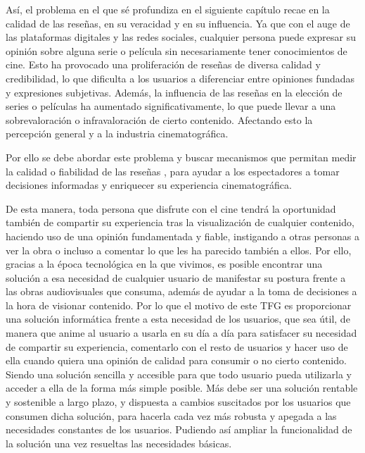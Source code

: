 Así, el problema en el que sé profundiza en el siguiente capítulo recae en la calidad de las reseñas, 
en su veracidad y en su influencia. Ya que con el auge de las plataformas digitales y las redes 
sociales, cualquier persona puede expresar su opinión sobre alguna serie o película sin necesariamente 
tener conocimientos de cine. Esto ha provocado una proliferación de reseñas de diversa calidad y 
credibilidad, lo que dificulta a los usuarios a diferenciar entre opiniones fundadas y expresiones 
subjetivas. Además, la influencia de las reseñas en la elección de series o películas ha aumentado 
significativamente, lo que puede llevar a una sobrevaloración o infravaloración de cierto contenido. 
Afectando esto la percepción general y a la industria cinematográfica.

Por ello se debe abordar este problema y buscar mecanismos que permitan medir la calidad o fiabilidad 
de las reseñas \cite{RRbyProfeMC}, para ayudar a los espectadores a tomar decisiones informadas \cite{RSforMovieRRating} y enriquecer su 
experiencia cinematográfica.

De esta manera, toda persona que disfrute con el cine tendrá la oportunidad también de compartir su 
experiencia tras la visualización de cualquier contenido, haciendo uso de una opinión fundamentada y 
fiable, instigando a otras personas a ver la obra o incluso a comentar lo que les ha parecido también a 
ellos. Por ello, gracias a la época tecnológica en la que vivimos, es posible encontrar una solución a 
esa necesidad de cualquier usuario de manifestar su postura frente a las obras audiovisuales que 
consuma, además de ayudar a la toma de decisiones a la hora de visionar contenido. Por lo que el motivo 
de este TFG es proporcionar una solución informática frente a esta necesidad de los usuarios, que sea 
útil, de manera que anime al usuario a usarla en su día a día para satisfacer su necesidad de compartir 
su experiencia, comentarlo con el resto de usuarios y hacer uso de ella cuando quiera una opinión de 
calidad para consumir o no cierto contenido. Siendo una solución sencilla y accesible para que todo 
usuario pueda utilizarla y acceder a ella de la forma más simple posible. Más debe ser una solución 
rentable y sostenible a largo plazo, y dispuesta a cambios suscitados por los usuarios que consumen 
dicha solución, para hacerla cada vez más robusta y apegada a las necesidades constantes de los 
usuarios. Pudiendo así ampliar la funcionalidad de la solución una vez resueltas las necesidades 
básicas. 

